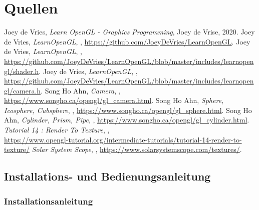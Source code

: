 \documentclass{article}
\let\oldsection\section
\renewcommand\section{\needspace{15\baselineskip}\oldsection}
\let\oldsubsection\subsection
\renewcommand\subsection{\needspace{10\baselineskip}\oldsubsection}
\let\oldsubsubsection\subsubsection
\renewcommand\subsubsection{\needspace{7\baselineskip}\oldsubsubsection}
\begin{document}
\section{Quellen}
\renewcommand{\section}[2]{}%
\begin{thebibliography}{9}
     Joey de Vries, \textit{Learn OpenGL - Graphics Programming}, Joey de Vrise, 2020.
     Joey de Vries, \textit{LearnOpenGL}, \the\year, \url{https://github.com/JoeyDeVries/LearnOpenGL}.
     Joey de Vries, \textit{LearnOpenGL}, \the\year, \url{https://github.com/JoeyDeVries/LearnOpenGL/blob/master/includes/learnopengl/shader.h}.
     Joey de Vries, \textit{LearnOpenGL}, \the\year, \url{https://github.com/JoeyDeVries/LearnOpenGL/blob/master/includes/learnopengl/camera.h}.
     Song Ho Ahn, \textit{Camera}, \the\year, \url{https://www.songho.ca/opengl/gl_camera.html}.
      Song Ho Ahn, \textit{Sphere, Icosphere, Cubsphere}, \the\year, \url{https://www.songho.ca/opengl/gl_sphere.html}.
     Song Ho Ahn, \textit{Cylinder, Prism, Pipe}, \the\year, \url{https://www.songho.ca/opengl/gl_cylinder.html}.
     \textit{Tutorial 14 : Render To Texture}, \the\year, \\
        \url{https://www.opengl-tutorial.org/intermediate-tutorials/tutorial-14-render-to-texture/}
     \textit{Solar System Scope}, \the\year, \url{https://www.solarsystemscope.com/textures/}.
\end{thebibliography}
\endgroup

\clearpage

\appendix
\renewcommand{\thesubsection}{\Alph{subsection}}
\section*{Anhang}

\subsection{Installations- und Bedienungsanleitung}

\subsubsection*{Installationsanleitung}
\end{document}
